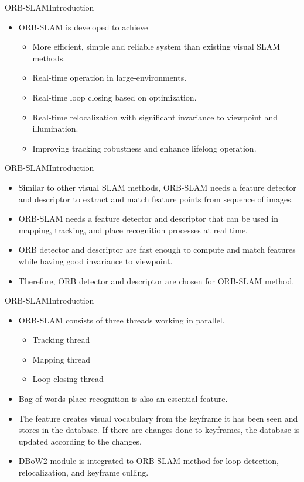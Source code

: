 \documentclass{beamer}
\begin{document}
\begin{frame}{ORB-SLAM}{Introduction}
\begin{itemize}
    \item{
ORB-SLAM is developed to achieve
\begin{itemize}
    \item{
    More efficient, simple and reliable system than existing visual SLAM methods.
    }
    \item{
    Real-time operation in large-environments.
    }
    \item{
    Real-time loop closing based on optimization.
    }
    \item{
    Real-time relocalization with significant invariance to viewpoint and illumination.
    }
    \item{
    Improving tracking robustness and enhance lifelong operation.
    }
\end{itemize}
}
\end{itemize}
  \end{frame}
\begin{frame}{ORB-SLAM}{Introduction}
\begin{itemize}
  \item{
  Similar to other visual SLAM methods, ORB-SLAM needs a feature detector and descriptor to extract and match feature points from sequence of images.
  }  
\item{
ORB-SLAM needs a feature detector and descriptor that can be used in mapping, tracking, and place recognition processes at real time. 
}
\item{
ORB detector and descriptor are fast enough to compute and match features while having good invariance to viewpoint.
}
\item{
Therefore, ORB detector and descriptor are chosen for ORB-SLAM method.
}

\end{itemize}
  \end{frame}
  
\begin{frame}{ORB-SLAM}{Introduction}
 
\begin{itemize}
  
      \item{
ORB-SLAM consists of three threads working in parallel.
\begin{itemize}
    \item{
    Tracking thread
    }
    \item{
    Mapping thread
    }
    \item{
    Loop closing thread 
    }
\end{itemize}
}
\item{
    Bag of words place recognition is also an essential feature.
}
\item{
    The feature creates visual vocabulary from the keyframe it has been seen and stores in the database. If there are changes done to keyframes, the database is updated according to the changes.
}
\item{
    DBoW2 module is integrated to ORB-SLAM method for loop detection, relocalization, and keyframe culling.
}
  \end{itemize}
\end{frame}
\end{document}

